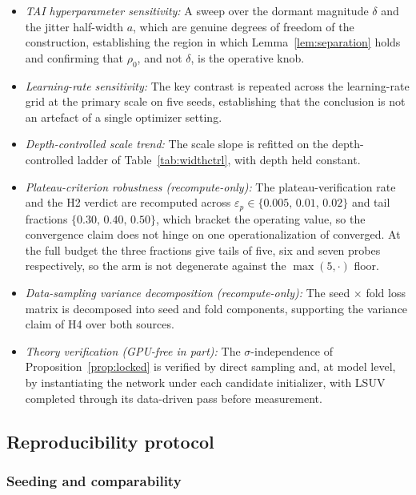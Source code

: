 \documentclass[final,5p,times,twocolumn]{elsarticle}
\theoremstyle{remark}
\newcommand{\rhoz}{\rho_{0}}
\begin{document}
\begin{itemize}
\item[] \textit{TAI hyperparameter sensitivity:} A sweep over the dormant
magnitude $\delta$ and the jitter half-width $a$, which are genuine degrees of
freedom of the construction, establishing the region in which
Lemma~\ref{lem:separation} holds and confirming that $\rhoz$, and not
$\delta$, is the operative knob.

\item[] \textit{Learning-rate sensitivity:} The key contrast is repeated across
the learning-rate grid at the primary scale on five seeds, establishing that the
conclusion is not an artefact of a single optimizer setting.

\item[] \textit{Depth-controlled scale trend:} The scale slope is refitted on the
depth-controlled ladder of Table~\ref{tab:widthctrl}, with depth held constant.

\item[] \textit{Plateau-criterion robustness (recompute-only):} The
plateau-verification rate and the H2 verdict are recomputed across
$\varepsilon_{p} \in \{0.005,\, 0.01,\, 0.02\}$ and tail
fractions $\{0.30,\, 0.40,\, 0.50\}$, which bracket the operating value, so the
convergence claim does not hinge on one operationalization of converged.
At the full budget the three fractions give tails of five, six and seven
probes respectively, so the arm is not degenerate against the
$\max(5,\cdot)$ floor.

\item[] \textit{Data-sampling variance decomposition (recompute-only):}
The seed $\times$ fold loss matrix is decomposed into seed and fold components,
supporting the variance claim of H4 over both sources.

\item[] \textit{Theory verification (GPU-free in part):} The
$\sigma$-independence of Proposition~\ref{prop:locked} is verified by direct
sampling and, at model level, by instantiating the network under each candidate
initializer, with LSUV completed through its data-driven pass before
measurement.
\end{itemize}

\subsection{Reproducibility protocol}
\label{sec:repro}

\subsubsection{Seeding and comparability}
\end{document}
